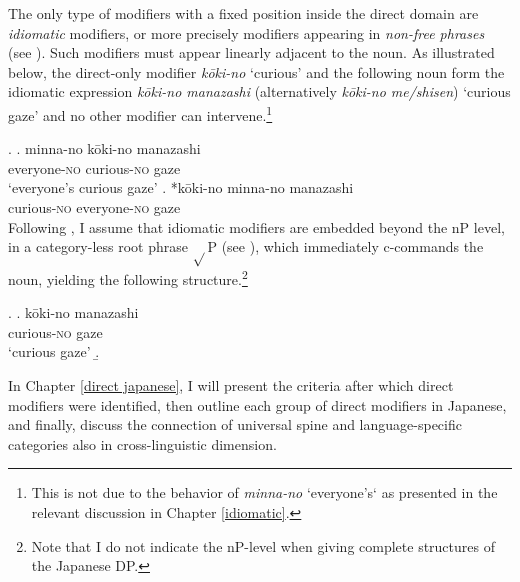 \documentclass [output=book,colorlinks,citecolor=brown]{langscibook}
\begin{document}
The only type of modifiers with a fixed position inside the direct domain are \textit{idiomatic} modifiers, or more precisely modifiers appearing in \textit{non-free phrases} (see \citealt{kohlich:2024:nonfree}). Such modifiers must appear linearly adjacent to the noun. As illustrated below, the direct-only modifier \textit{kōki-no} `curious' and the following noun form the idiomatic expression \textit{kōki-no manazashi} (alternatively \textit{kōki-no me/shisen}) `curious gaze' and no other modifier can intervene.\footnote{This is not due to the behavior of \textit{minna-no} `everyone's` as presented in the relevant discussion in Chapter \ref{idiomatic}.} %


\ex. \ag. minna-no kōki-no manazashi\\
everyone-\textsc{no} curious-\textsc{no} gaze\\
`everyone's curious gaze'
\bg. *kōki-no minna-no manazashi\\
curious-\textsc{no} everyone-\textsc{no} gaze\\

Following \citet{svenonius:2008:position}, I assume that idiomatic modifiers are embedded beyond the nP level, in a category-less root phrase $\sqrt{}$P (see \citealt{marantz:1997:no}), which immediately c-commands the noun, yielding the following structure.\footnote{Note that I do not indicate the nP-level when giving complete structures of the Japanese DP.}

\ex. \ag. kōki-no manazashi\\
curious-\textsc{no} gaze\\
`curious gaze'
\b. 

In Chapter \ref{direct japanese}, I will present the criteria after which direct modifiers were identified, then outline each group of direct modifiers in Japanese, and finally, discuss the connection of universal spine and language-specific categories also in cross-linguistic dimension.
\end{document}
